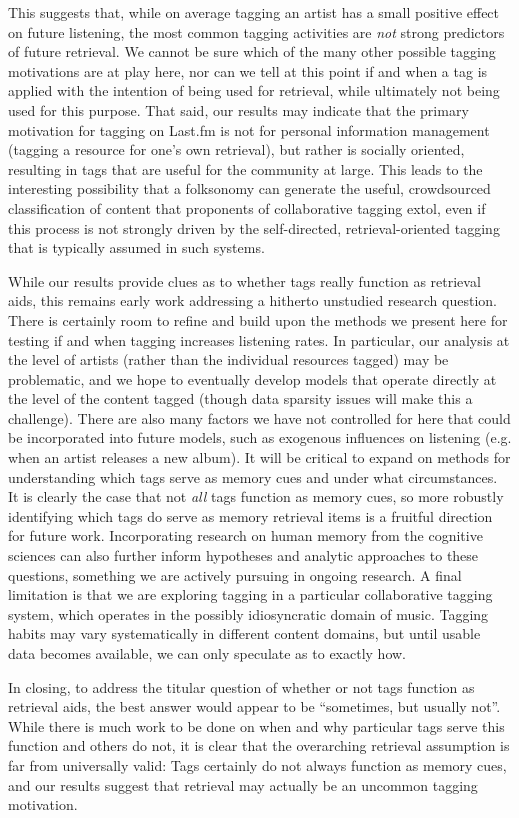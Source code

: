 This suggests that, while on average tagging an artist  has a small positive effect on future listening, the most common tagging activities are \emph{not} strong predictors of future retrieval. We cannot be sure which of the many other possible tagging motivations are at play here, nor can we tell at this point if and when a tag is applied with the intention of being used for retrieval, while ultimately not being used for this purpose. That said, our results may indicate that the primary motivation for tagging on Last.fm is not for personal information management (tagging a resource for one's own retrieval), but rather is socially oriented, resulting in tags that are useful for the community at large. This leads to the interesting possibility that a folksonomy can generate the useful, crowdsourced classification of content that proponents of collaborative tagging extol, even if this process is not strongly driven by the self-directed, retrieval-oriented tagging that is typically assumed in such systems.

While our results provide clues as to whether tags really function as retrieval aids, this remains early work addressing a hitherto unstudied research question. There is certainly room to refine and build upon the methods we present here for testing if and when tagging increases listening rates. In particular, our analysis at the level of artists (rather than the individual resources tagged) may be problematic, and we hope to eventually develop models that operate directly at the level of the content tagged (though data sparsity issues will make this a challenge). There are also many factors we have not controlled for here that could be incorporated into future models, such as exogenous influences on listening (e.g. when an artist releases a new album). It will be critical to expand on methods for understanding which tags serve as memory cues and under what circumstances. It is clearly the case that not \emph{all} tags function as memory cues, so more robustly identifying which tags do serve as memory retrieval items is a fruitful direction for future work. Incorporating research on human memory from the cognitive sciences can also further inform hypotheses and analytic approaches to these questions, something we are actively pursuing in ongoing research. A final limitation is that we are exploring tagging in a particular collaborative tagging system, which operates in the possibly idiosyncratic domain of music. Tagging habits may vary systematically in different content domains, but until usable data becomes available, we can only speculate as to exactly how. 

In closing, to address the titular question of whether or not tags function as retrieval aids, the best answer would appear to be ``sometimes, but usually not''. While there is much work to be done on when and why particular tags serve this function and others do not, it is clear that the overarching retrieval assumption is far from universally valid: Tags certainly do not always function as memory cues, and our results suggest that retrieval may actually be an uncommon tagging motivation.

